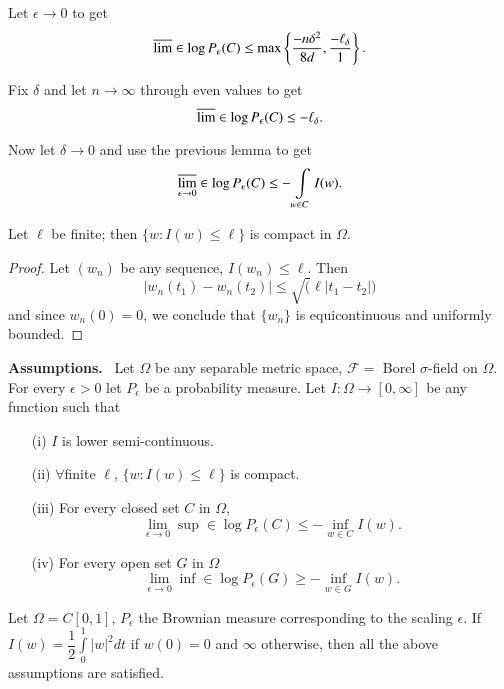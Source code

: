Let $\epsilon\to 0$ to get
$$
\varlimsup \in \log P_{\epsilon}(C)\leq \max
\left\{\frac{-n\delta^{2}}{8d},\frac{-\ell_{\delta}}{1}\right\}.
$$

Fix $\delta$ and let $n\to \infty$ through even values to get
$$
\varlimsup \in \log P_{\epsilon}(C)\leq -\ell_{\delta}.
$$

Now let $\delta\to 0$ and use the previous lemma to get
$$
\varlimsup\limits_{\epsilon\to 0}\in \log P_{\epsilon}(C)\leq
-\int\limits_{w\in C}I(w).
$$

\begin{prop*}
Let $\ell$ be finite; then $\{w:I(w)\leq \ell\}$ is compact in $\Omega$.
\end{prop*}

\begin{proof}
Let $(w_{n})$ be any sequence, $I(w_{n})\leq \ell$. Then
$$
|w_{n}(t_{1})-w_{n}(t_{2})|\leq \surd(\ell|t_{1}-t_{2}|)
$$
and since $w_{n}(0)=0$, we conclude that $\{w_{n}\}$ is equicontinuous
and uniformly bounded.
\end{proof}

\noindent
{\bf Assumptions.}~ Let $\Omega$ be any separable metric space,
$\mathscr{F}=$ Borel $\sigma$-field on $\Omega$. For every
$\epsilon>0$ let $P_{\epsilon}$ be a probability measure. Let
$I:\Omega\to [0,\infty]$ be any function such that
\begin{itemize}
\item[(i)] $I$ is lower semi-continuous.

\item[(ii)] $\forall$\pageoriginale finite $\ell$, $\{w:I(w)\leq
  \ell\}$ is compact.

\item[(iii)] For every closed set $C$ in $\Omega$,
$$
\lim\limits_{\epsilon\to 0}\sup \in \log P_{\epsilon}(C)\leq
-\inf\limits_{w\in C}I(w).
$$

\item[(iv)] For every open set $G$ in $\Omega$
$$
\lim\limits_{\epsilon\to 0}\inf \in \log P_{\epsilon}(G)\geq
-\inf\limits_{w\in G}I(w).
$$
\end{itemize}

\begin{remark*}
Let $\Omega=C[0,1]$, $P_{\epsilon}$ the Brownian measure corresponding
to the scaling $\epsilon$. If
$I(w)=\dfrac{1}{2}\int\limits^{1}_{0}|w|^{2}dt$ if $w(0)=0$ and
$\infty$ otherwise, then all the above assumptions are satisfied.
\end{remark*}

